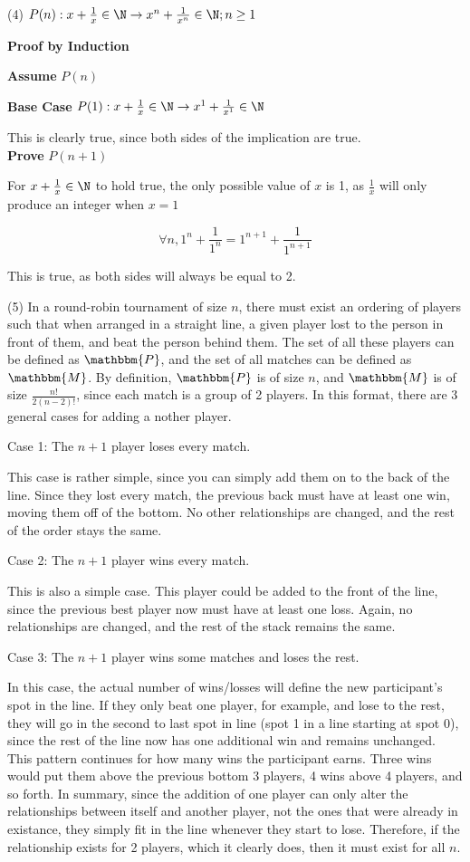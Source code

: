\documentclass[]{article}
\def\imp{\rightarrow}
\begin{document}
\noindent (4) $P(n): x+ \frac{1}{x} \in \N \imp x^n + \frac{1}{x^n} \in \N; n \geq 1$

\textbf{Proof by Induction}

\textbf{Assume} $P(n)$

\textbf{Base Case} $P(1): x + \frac{1}{x} \in \N \imp x^1 + \frac{1}{x^1} \in \N$

This is clearly true, since both sides of the implication are true. \\

\textbf{Prove} $P(n+1)$

For $x + \frac{1}{x} \in \N$ to hold true, the only possible value of $x$ is 1, as $\frac{1}{x}$ will only produce an integer when $x = 1$

$$\forall n, 1^n+\frac{1}{1^n} = 1^{n+1} + \frac{1}{1^{n+1}}$$

This is true, as both sides will always be equal to 2.

\newpage

\noindent (5) In a round-robin tournament of size $n$, there must exist an ordering of players such that when arranged in a straight line, a given player lost to the person in front of them, and beat the person behind them. The set of all these players can be defined as $\mathbbm{P}$, and the set of all matches can be defined as $\mathbbm{M}$. By definition, $\mathbbm{P}$ is of size $n$, and $\mathbbm{M}$ is of size $\frac{n!}{2(n-2)!}$, since each match is a group of 2 players. In this format, there are 3 general cases for adding a nother player.

Case 1: The $n+1$ player loses every match.

This case is rather simple, since you can simply add them on to the back of the line. Since they lost every match, the previous back must have at least one win, moving them off of the bottom. No other relationships are changed, and the rest of the order stays the same.

Case 2: The $n+1$ player wins every match.

This is also a simple case. This player could be added to the front of the line, since the previous best player now must have at least one loss. Again, no relationships are changed, and the rest of the stack remains the same.

Case 3: The $n+1$ player wins some matches and loses the rest.

In this case, the actual number of wins/losses will define the new participant's spot in the line. If they only beat one player, for example, and lose to the rest, they will go in the second to last spot in line (spot 1 in a line starting at spot 0), since the rest of the line now has one additional win and remains unchanged. This pattern continues for how many wins the participant earns. Three wins would put them above the previous bottom 3 players, 4 wins above 4 players, and so forth. In summary, since the addition of one player can only alter the relationships between itself and another player, not the ones that were already in existance, they simply fit in the line whenever they start to lose. Therefore, if the relationship exists for 2 players, which it clearly does, then it must exist for all $n$.
 
\end{document}
